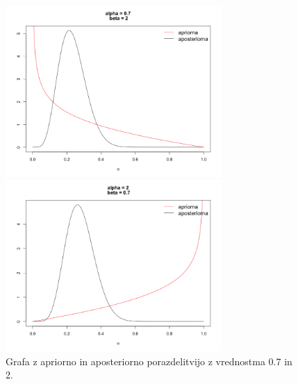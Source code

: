 \documentclass[a4paper,11pt]{article}
\begin{document}
\begin{figure}[ht!]
    \begin{minipage}{0.5\textwidth}
        \centering
        \includegraphics[width=82mm]{Slike/1_4.png}
    \end{minipage}\hfill
    \begin{minipage}{0.5\textwidth}
        \centering
        \includegraphics[width=82mm]{Slike/1_5.png}
    \end{minipage}\hfill
    \caption{Grafa z apriorno in aposteriorno porazdelitvijo z vrednostma 0.7 in 2.}
\end{figure}
\end{document}
